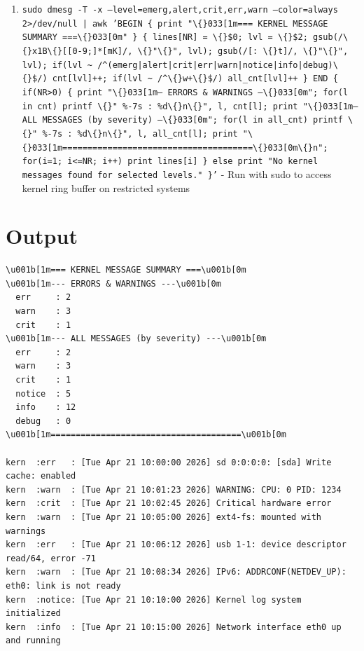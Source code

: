 \documentclass[openany]{book}
\begin{document}
\begin{enumerate}
  \item \texttt{sudo dmesg -T -x --level=emerg,alert,crit,err,warn --color=always 2>/dev/null | awk 'BEGIN \{ print "\textbackslash\{\}033[1m=== KERNEL MESSAGE SUMMARY ===\textbackslash\{\}033[0m" \} \{ lines[NR] = \textbackslash\{\}\$0; lvl = \textbackslash\{\}\$2; gsub(/\textbackslash\{\}x1B\textbackslash\{\}[[0-9;]*[mK]/, \textbackslash\{\}"\textbackslash\{\}", lvl); gsub(/[: \textbackslash\{\}t]/, \textbackslash\{\}"\textbackslash\{\}", lvl); if(lvl \textasciitilde{} /\textasciicircum{}(emerg|alert|crit|err|warn|notice|info|debug)\textbackslash\{\}\$/) cnt[lvl]++; if(lvl \textasciitilde{} /\textasciicircum{}\textbackslash\{\}w+\textbackslash\{\}\$/) all\_cnt[lvl]++ \} END \{ if(NR>0) \{ print "\textbackslash\{\}033[1m--- ERRORS \& WARNINGS ---\textbackslash\{\}033[0m"; for(l in cnt) printf \textbackslash\{\}"  \%-7s : \%d\textbackslash\{\}n\textbackslash\{\}", l, cnt[l]; print "\textbackslash\{\}033[1m--- ALL MESSAGES (by severity) ---\textbackslash\{\}033[0m"; for(l in all\_cnt) printf \textbackslash\{\}"  \%-7s : \%d\textbackslash\{\}n\textbackslash\{\}", l, all\_cnt[l]; print "\textbackslash\{\}033[1m======================================\textbackslash\{\}033[0m\textbackslash\{\}n"; for(i=1; i<=NR; i++) print lines[i] \} else print "No kernel messages found for selected levels." \}'} - Run with sudo to access kernel ring buffer on restricted systems
\end{enumerate}

\section*{Output}
\begin{lstlisting}
\u001b[1m=== KERNEL MESSAGE SUMMARY ===\u001b[0m
\u001b[1m--- ERRORS & WARNINGS ---\u001b[0m
  err     : 2
  warn    : 3
  crit    : 1
\u001b[1m--- ALL MESSAGES (by severity) ---\u001b[0m
  err     : 2
  warn    : 3
  crit    : 1
  notice  : 5
  info    : 12
  debug   : 0
\u001b[1m======================================\u001b[0m

kern  :err   : [Tue Apr 21 10:00:00 2026] sd 0:0:0:0: [sda] Write cache: enabled
kern  :warn  : [Tue Apr 21 10:01:23 2026] WARNING: CPU: 0 PID: 1234
kern  :crit  : [Tue Apr 21 10:02:45 2026] Critical hardware error
kern  :warn  : [Tue Apr 21 10:05:00 2026] ext4-fs: mounted with warnings
kern  :err   : [Tue Apr 21 10:06:12 2026] usb 1-1: device descriptor read/64, error -71
kern  :warn  : [Tue Apr 21 10:08:34 2026] IPv6: ADDRCONF(NETDEV_UP): eth0: link is not ready
kern  :notice: [Tue Apr 21 10:10:00 2026] Kernel log system initialized
kern  :info  : [Tue Apr 21 10:15:00 2026] Network interface eth0 up and running
\end{lstlisting}
\end{document}
